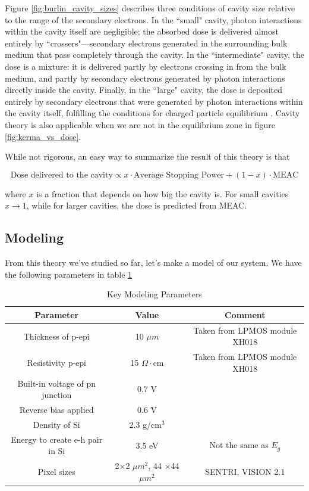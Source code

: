 \documentclass{article}
\begin{document}
Figure \ref{fig:burlin_cavity_sizes} describes three conditions of cavity size relative to the range of the secondary electrons. In the ``small" cavity, photon interactions within the cavity itself are negligible; the absorbed dose is delivered almost entirely by 
``crossers"—secondary electrons generated in the surrounding bulk medium that pass completely through the cavity. In the ``intermediate" cavity, the dose is a mixture: it is delivered partly by electrons crossing in from the bulk medium, and partly by 
secondary electrons generated by photon interactions directly inside the cavity. Finally, in the ``large" cavity, the dose is deposited entirely by secondary electrons that were generated by photon interactions within the cavity itself, fulfilling the conditions for charged particle equilibrium \cite{Attix1986}.
Cavity theory is also applicable when we are not in the equilibrium zone in figure \ref{fig:kerma_vs_dose}.

While not rigorous, an easy way to summarize the result of this theory is that 

\[\text{Dose delivered to the cavity} \propto x\cdot \text{Average Stopping Power}  + (1-x) \cdot \text{MEAC}\]


where $x$ is a fraction that depends on how big the cavity is. For small cavities $x \rightarrow 1$, while for larger cavities, the dose is predicted from MEAC.


\subsection{Modeling}

From this theory we've studied so far, let's make a model of our system. We have the following parameters in table \ref{tab:modeling_signal_gen}


\begin{table}[H]
    \centering
    \caption{Key Modeling Parameters}
    \label{tab:modeling_signal_gen}
    \begin{tabular}{|c|c|c|} \hline
        \textbf{Parameter} & \textbf{Value} & \textbf{Comment} \\ \hline

        Thickness of p-epi & 10 $\mu m$ & Taken from LPMOS module XH018 \\ \hline
        Resistivity p-epi & 15 $\Omega \cdot$cm & Taken from LPMOS module XH018 \\ \hline
        Built-in voltage of pn junction & 0.7 V & \\ \hline
        Reverse bias applied & 0.6 V & \\ \hline
        Density of Si & 2.3 g/cm$^3$ & \\ \hline
        Energy to create e-h pair in Si & 3.5 eV & Not the same as $E_g$ \cite{zhou_development_nodate} \\ \hline
        Pixel sizes & 2$\times$2 $\mu m^2$, 44 $\times$44 $\mu m^2$ & SENTRI, VISION 2.1 \\ \hline

        
    \end{tabular}
\end{table}
\end{document}
